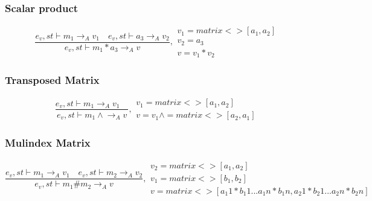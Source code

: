 \subsubsection{Scalar product}
\begin{equation}
	\frac { { e }_{ v },st\vdash { m }_{ 1 }{ \rightarrow  }_{ A }{ v }_{ 1 }\quad { e }_{ v },st\vdash { a }_{ 3 }{ \rightarrow  }_{ A }{ v }_{ 2 } }{ { e }_{ v },st\vdash { m }_{ 1 }\ast { a }_{ 3 }{ \rightarrow  }_{ A }{ v } } ,\begin{matrix} { v }_{ 1 }=matrix<>[{ a }_{ 1 },{ a }_{ 2 }] \\ { v }_{ 2 }={ a }_{ 3 } \\ v={ v }_{ 1 }*{ v }_{ 2 } \end{matrix}
\end{equation}

\subsubsection{Transposed Matrix}
\begin{equation}
	\frac { { e }_{ v },st\vdash { m }_{ 1 }{ \rightarrow  }_{ A }{ v }_{ 1 }\quad  }{ { e }_{ v },st\vdash { m }_{ 1 }\wedge { \rightarrow  }_{ A }{ v } } ,\begin{matrix} { v }_{ 1 }=matrix<>[{ a }_{ 1 },{ a }_{ 2 }] \\ { v }={ v }_{ 1 }\wedge =matrix<>[{ a }_{ 2 },{ a }_{ 1 }] \end{matrix}
\end{equation}

\subsubsection{Mulindex Matrix}
\begin{equation}
	\frac { { e }_{ v },st\vdash { m }_{ 1 }{ \rightarrow  }_{ A }{ v }_{ 1 }\quad { e }_{ v },st\vdash { m }_{ 2 }{ \rightarrow  }_{ A }{ v }_{ 2 } }{ { e }_{ v },st\vdash { m }_{ 1 }\#{ m }_{ 2 }{ \rightarrow  }_{ A }{ v } } ,\begin{matrix} { v }_{ 2 }=matrix<>[{ a }_{ 1 },{ a }_{ 2 }] \\ { v }_{ 1 }=matrix<>[{ b }_{ 1 },{ b }_{ 2 }] \\ v=matrix<>[{ a }_{ 1 }1*{ b }_{ 1 }1 ... { a }_{ 1 }n*{ b }_{ 1 }n,{ a }_{ 2 }1*{ b }_{ 2 }1 ... { a }_{ 2 }n*{ b }_{ 2 }n] \end{matrix}
\end{equation}

